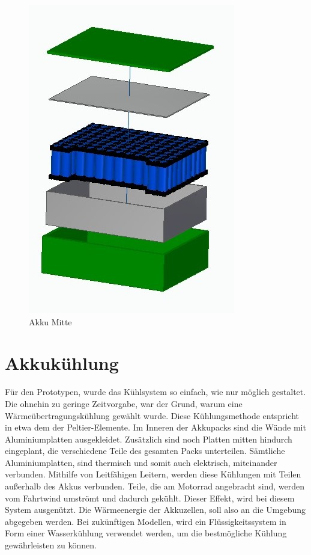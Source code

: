 \begin{figure} [H]
	\begin{center}
		\includegraphics[scale=0.5]{figures/mechanik/Akku_Mitte_Explosion.jpg}
			\caption{Akku Mitte}
			\label{fig:Akku Mitte}
	\end{center}
\end{figure}

\newpage

\section{Akkukühlung}  \label{Akkukühlung}

Für den Prototypen, wurde das Kühlsystem so einfach, wie nur möglich gestaltet. Die ohnehin zu geringe Zeitvorgabe, war der Grund, warum eine Wärmeübertragungskühlung gewählt wurde. Diese Kühlungsmethode entspricht in etwa dem der Peltier-Elemente. 
Im Inneren der Akkupacks sind die Wände mit Aluminiumplatten ausgekleidet. Zusätzlich sind noch Platten mitten hindurch eingeplant, die verschiedene Teile des gesamten Packs unterteilen. Sämtliche Aluminiumplatten, sind thermisch und somit auch elektrisch, miteinander verbunden. Mithilfe von Leitfähigen Leitern, werden diese Kühlungen mit Teilen außerhalb des Akkus verbunden. 
Teile, die am Motorrad angebracht sind, werden vom Fahrtwind umströmt und dadurch gekühlt. 
Dieser Effekt, wird bei diesem System ausgenützt. Die Wärmeenergie der Akkuzellen, soll also an die Umgebung abgegeben werden.
Bei zukünftigen Modellen, wird ein Flüssigkeitssystem in Form einer Wasserkühlung verwendet werden, um die bestmögliche Kühlung gewährleisten zu können.

